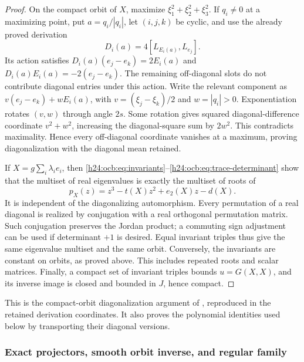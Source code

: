 \begin{proof}
On the compact orbit of $X$, maximize
$\xi_1^2+\xi_2^2+\xi_3^2$. If $q_i\ne0$ at a maximizing point,
put $a=q_i/|q_i|$, let $(i,j,k)$ be cyclic, and use the already proved
derivation
\begin{equation}
 D_i(a)=4[L_{E_i(a)},L_{e_j}].
 \label{h24:ocb:eq:derivation}\tag{OCB5}
\end{equation}
Its action satisfies
$D_i(a)(e_j-e_k)=2E_i(a)$ and
$D_i(a)E_i(a)=-2(e_j-e_k)$. The remaining off-diagonal slots do not
contribute diagonal entries under this action. Write the relevant
component as $v(e_j-e_k)+wE_i(a)$, with
$v=(\xi_j-\xi_k)/2$ and $w=|q_i|>0$. Exponentiation rotates $(v,w)$
through angle $2s$. Some rotation gives squared diagonal-difference
coordinate $v^2+w^2$, increasing the diagonal-square sum by $2w^2$.
This contradicts maximality. Hence every off-diagonal coordinate
vanishes at a maximum, proving diagonalization with the diagonal mean
retained.

If $X=g\sum_i\lambda_i e_i$, then
\eqref{h24:ocb:eq:invariants}--\eqref{h24:ocb:eq:trace-determinant} show that
the multiset of real eigenvalues is exactly the multiset of roots of
\begin{equation}
 p_X(z)=z^3-t(X)z^2+e_2(X)z-d(X).
 \label{h24:ocb:eq:characteristic-polynomial}\tag{OCB6}
\end{equation}
It is independent of the diagonalizing automorphism. Every permutation
of a real diagonal is realized by conjugation with a real orthogonal
permutation matrix. Such conjugation preserves the Jordan product;
a commuting sign adjustment can be used if determinant $+1$ is
desired. Equal invariant triples thus give the same eigenvalue multiset
and the same orbit. Conversely, the invariants are constant on orbits,
as proved above. This includes repeated roots and scalar matrices.
Finally, a compact set of invariant triples bounds $u=G(X,X)$, and
its inverse image is closed and bounded in $J$, hence compact.
\end{proof}

This is the compact-orbit diagonalization argument of
\cite[Proposition~2.8.2, pp.~56--57]{h24:Yokota2009}, reproduced in the
retained derivation coordinates. It also proves the polynomial identities
used below by transporting their diagonal versions.

\subsubsection{Exact projectors, smooth orbit inverse, and regular family}
\label{h24:ocb:sec:regular-family}


